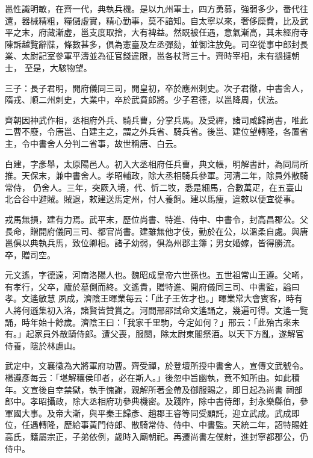 \begin{pinyinscope}
 邕性識明敏，在齊一代，典執兵機。是以九州軍士，四方勇募，強弱多少，番代往還，器械精粗，糧儲虛實，精心勤事，莫不諳知。自太寧以來，奢侈糜費，比及武平之末，府藏漸虛，邕支度取捨，大有裨益。然既被任遇，意氣漸高，其未經府寺陳訴越覽辭牒，條數甚多，俱為憲臺及左丞彈劾，並御注放免。司空從事中郎封長業、太尉記室參軍平濤並為征官錢違限，邕各杖背三十。齊時宰相，未有撾撻朝士，
 至是，大駭物望。



 三子：長子君明，開府儀同三司，開皇初，卒於應州刺史。次子君徹，中書舍人，隋戎、順二州刺史，大業中，卒於武賁郎將。少子君德，以邕降周，伏法。



 齊朝因神武作相，丞相府外兵、騎兵曹，分掌兵馬。及受禪，諸司咸歸尚書，唯此二曹不廢，令唐邕、白建主之，謂之外兵省、騎兵省。後邕、建位望轉隆，各置省主，令中書舍人分判二省事，故世稱唐、白云。



 白建，字彥舉，太原陽邑人。初入大丞相府任兵曹，典文帳，明解書計，為同局所推。天保末，兼中書舍人。孝昭輔政，除大丞相騎兵參軍。河清二年，除員外散騎常侍，
 仍舍人。三年，突厥入境，代、忻二牧，悉是細馬，合數萬疋，在五臺山北合谷中避賊。賊退，敕建送馬定州，付人養飼。建以馬瘦，違敕以便宜從事。



 戎馬無損，建有力焉。武平末，歷位尚書、特進、侍中、中書令，封高昌郡公。父長命，贈開府儀同三司、都官尚書。建雖無他才伎，勤於在公，以溫柔自處。與唐邕俱以典執兵馬，致位卿相。諸子幼弱，俱為州郡主簿；男女婚嫁，皆得勝流。卒，贈司空。



 元文遙，字德遠，河南洛陽人也。魏昭成皇帝六世孫也。五世祖常山王遵。父唏，有孝行，父卒，廬於墓側而終。文遙貴，贈特進、開府儀同三司、中書監，謚曰孝。文遙敏慧
 夙成，濟陰王暉業每云：「此子王佐才也。」暉業常大會賓客，時有人將何遜集初入洛，諸賢皆贊賞之。河間邢邵試命文遙誦之，幾遍可得。文遙一覽誦，時年始十餘歲。濟陰王曰：「我家千里駒，今定如何？」邢云：「此殆古來未有。」起家員外散騎侍郎。遭父喪，服闋，除太尉東閣祭酒。以天下方亂，遂解官侍養，隱於林慮山。



 武定中，文襄徵為大將軍府功曹。齊受禪，於登壇所授中書舍人，宣傳文武號令。楊遵彥每云：「堪解穰侯印者，必在斯人。」後忽中旨幽執，竟不知所由。如此積年。文宣後自幸禁獄，執手愧謝，親解所著金帶及御服賜之，即日起為尚書
 祠部郎中。孝昭攝政，除大丞相府功參典機密。及踐阼，除中書侍郎，封永樂縣伯，參軍國大事。及帝大漸，與平秦王歸彥、趙郡王睿等同受顧託，迎立武成。武成即位，任遇轉隆，歷給事黃門侍郎、散騎常侍、侍中、中書監。天統二年，詔特賜姓高氏，籍屬宗正，子弟依例，歲時入廟朝祀。再遷尚書左僕射，進封寧都郡公，仍侍中。




\end{pinyinscope}
